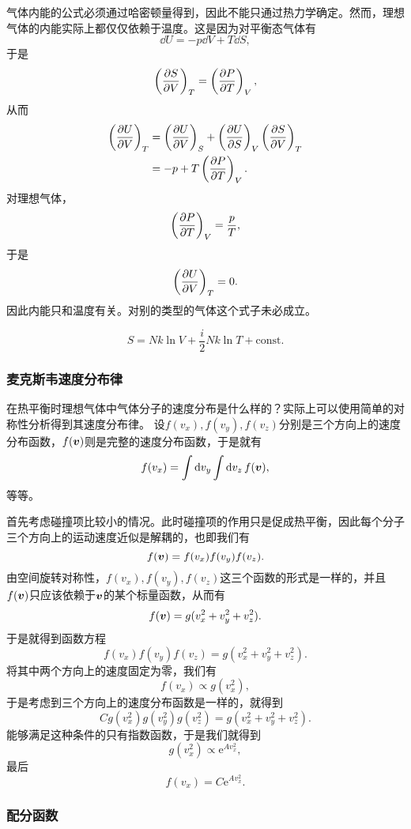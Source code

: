 \documentclass[hyperref, UTF8, a4paper]{ctexart}
\newcommand*{\ee}{\mathrm{e}}
\newcommand*{\const}{\mathrm{const}}
\begin{document}
气体内能的公式必须通过哈密顿量得到，因此不能只通过热力学确定。然而，理想气体的内能实际上都仅仅依赖于温度。这是因为对平衡态气体有
\[
    \dd{U} = - p \dd{V} + T \dd{S},
\]
于是
\[
    \left(\pdv{S}{V}\right)_T = \left(\pdv{P}{T}\right)_V,
\]
从而
\[
    \begin{aligned}
        \left(\pdv{U}{V}\right)_T &= \left(\pdv{U}{V}\right)_S + \left(\pdv{U}{S}\right)_V \left(\pdv{S}{V}\right)_T \\
        &= - p + T \left(\pdv{P}{T}\right)_V.
    \end{aligned}
\]
对理想气体，
\[
    \left(\pdv{P}{T}\right)_V = \frac{p}{T},
\]
于是
\[
    \left(\pdv{U}{V}\right)_T = 0.
\]
因此内能只和温度有关。对别的类型的气体这个式子未必成立。

\begin{equation}
    S = Nk \ln V + \frac{i}{2} Nk \ln T + \const.
    \label{eq:entropy-from-thermodynamics}
\end{equation}

\subsubsection{麦克斯韦速度分布律}

在热平衡时理想气体中气体分子的速度分布是什么样的？实际上可以使用简单的对称性分析得到其速度分布律。
设$f(v_x),f(v_y),f(v_z)$分别是三个方向上的速度分布函数，$f(\vb*{v})$则是完整的速度分布函数，于是就有
\[
    f(v_x) = \int \dd{v_y} \int \dd{v_z} f(\vb*{v}),
\]
等等。

首先考虑碰撞项比较小的情况。此时碰撞项的作用只是促成热平衡，因此每个分子三个方向上的运动速度近似是解耦的，也即我们有
\[
    f(\vb*{v}) = f(v_x) f(v_y) f(v_z).
\]
由空间旋转对称性，$f(v_x),f(v_y),f(v_z)$这三个函数的形式是一样的，并且$f(\vb*{v})$只应该依赖于$\vb*{v}$的某个标量函数，从而有
\[
    f(\vb*{v}) = g(v_x^2+v_y^2+v_z^2).
\]
于是就得到函数方程
\[
    f(v_x) f(v_y) f(v_z) = g(v_x^2+v_y^2+v_z^2).
\]
将其中两个方向上的速度固定为零，我们有
\[
    f(v_x) \propto g(v_x^2),
\]
于是考虑到三个方向上的速度分布函数是一样的，就得到
\[
    C g(v_x^2) g(v_y^2) g(v_z^2) = g(v_x^2+v_y^2+v_z^2).
\]
能够满足这种条件的只有指数函数，于是我们就得到
\[
    g(v_x^2) \propto \ee^{A v_x^2},
\]
最后
\[
    f(v_x) = C \ee^{A v_x^2}.
\]

\subsubsection{配分函数}
\end{document}
